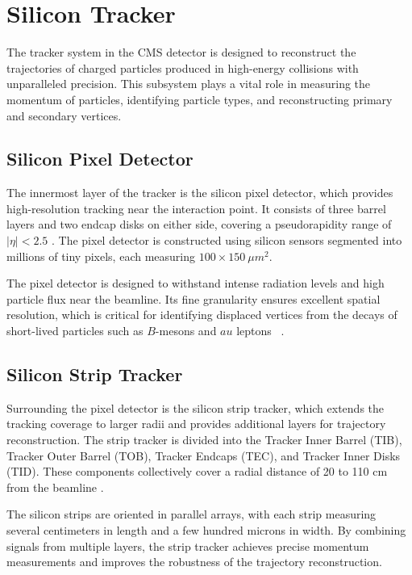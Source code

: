 \section{Silicon Tracker}

The tracker system in the CMS detector is designed to reconstruct the trajectories of charged particles produced in high-energy collisions with unparalleled precision. This subsystem plays a vital role in measuring the momentum of particles, identifying particle types, and reconstructing primary and secondary vertices.

\subsection{Silicon Pixel Detector}
The innermost layer of the tracker is the silicon pixel detector, which provides high-resolution tracking near the interaction point. It consists of three barrel layers and two endcap disks on either side, covering a pseudorapidity range of $|\eta| < 2.5$ \cite{tracker_tdr}. The pixel detector is constructed using silicon sensors segmented into millions of tiny pixels, each measuring $100\times150~\mu m^2$.

The pixel detector is designed to withstand intense radiation levels and high particle flux near the beamline. Its fine granularity ensures excellent spatial resolution, which is critical for identifying displaced vertices from the decays of short-lived particles such as $B$-mesons and $	au$ leptons ~\cite{pixels}.

\subsection{Silicon Strip Tracker}
Surrounding the pixel detector is the silicon strip tracker, which extends the tracking coverage to larger radii and provides additional layers for trajectory reconstruction. The strip tracker is divided into the Tracker Inner Barrel (TIB), Tracker Outer Barrel (TOB), Tracker Endcaps (TEC), and Tracker Inner Disks (TID). These components collectively cover a radial distance of 20 to 110 cm from the beamline \cite{tracker_tdr}.

The silicon strips are oriented in parallel arrays, with each strip measuring several centimeters in length and a few hundred microns in width. By combining signals from multiple layers, the strip tracker achieves precise momentum measurements and improves the robustness of the trajectory reconstruction. \cite{strips}

